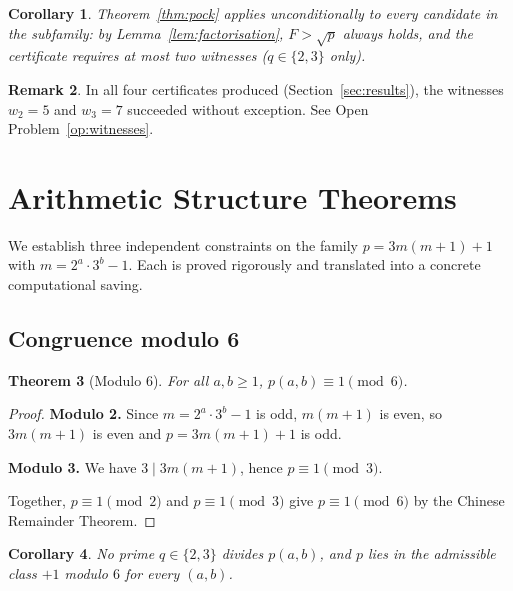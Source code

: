 \documentclass[11pt,a4paper]{article}
\theoremstyle{plain}
\newtheorem{theorem}{Theorem}[section]
\newtheorem{corollary}[theorem]{Corollary}
\theoremstyle{definition}
\newtheorem{remark}[theorem]{Remark}
\begin{document}
\begin{corollary}\label{cor:unconditional}
Theorem~\ref{thm:pock} applies \emph{unconditionally} to every candidate in
the subfamily: by Lemma~\ref{lem:factorisation}, $F > \sqrt{p}$ always holds,
and the certificate requires at most two witnesses ($q \in \{2, 3\}$ only).
\end{corollary}

\begin{remark}\label{rem:witnesses}
In all four certificates produced (Section~\ref{sec:results}), the witnesses
$w_2 = 5$ and $w_3 = 7$ succeeded without exception. See Open
Problem~\ref{op:witnesses}.
\end{remark}

\section{Arithmetic Structure Theorems}
\label{sec:arithmetic}

We establish three independent constraints on the family $p = 3m(m+1) + 1$
with $m = 2^a \cdot 3^b - 1$. Each is proved rigorously and translated into a
concrete computational saving.

\subsection{Congruence modulo 6}

\begin{rigorousbox}
\begin{theorem}[Modulo 6]\label{thm:mod6}
For all $a, b \ge 1$, $p(a, b) \equiv 1 \pmod{6}$.
\end{theorem}
\end{rigorousbox}

\begin{proof}
\textbf{Modulo 2.} Since $m = 2^a \cdot 3^b - 1$ is odd, $m(m+1)$ is even, so
$3m(m+1)$ is even and $p = 3m(m+1) + 1$ is odd.

\textbf{Modulo 3.} We have $3 \mid 3m(m+1)$, hence $p \equiv 1 \pmod{3}$.

Together, $p \equiv 1 \pmod{2}$ and $p \equiv 1 \pmod{3}$ give
$p \equiv 1 \pmod{6}$ by the Chinese Remainder Theorem.
\end{proof}

\begin{corollary}\label{cor:mod6}
No prime $q \in \{2, 3\}$ divides $p(a, b)$, and $p$ lies in the admissible
class $+1$ modulo $6$ for every $(a, b)$.
\end{corollary}
\end{document}
